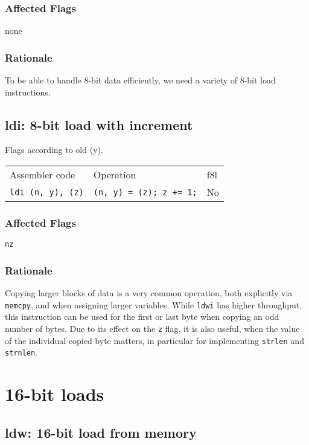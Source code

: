 \documentclass{book}
\begin{document}
\subsubsection*{Affected Flags}

none

\subsubsection*{Rationale}

To be able to handle 8-bit data efficiently, we need a variety of 8-bit load instructions.

\subsection{ldi: 8-bit load with increment}

Flags according to old (y).

\begin{tabular}{l l l}
Assembler code           & Operation                      & f8l \\
\texttt{ldi (n, y), (z)} & \texttt{(n, y) = (z); z += 1;} & No \\
\end{tabular}

\subsubsection*{Affected Flags}

\texttt{nz}

\subsubsection*{Rationale}

Copying larger blocks of data is a very common operation, both explicitly via \texttt{memcpy}, and when assigning larger variables. While \texttt{ldwi} has higher throughput, this instruction can be used for the first or last byte when copying an odd number of bytes. Due to its effect on the \texttt{z} flag, it is also useful, when the value of the individual copied byte matters, in particular for implementing \texttt{strlen} and \texttt{strnlen}.


\section{16-bit loads}

\subsection{ldw: 16-bit load from memory}
\end{document}
